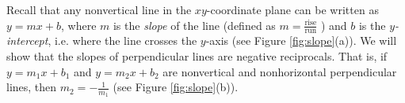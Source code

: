 \begin{center}\statecomment[0.6\textwidth]{\begin{equation}\label{eqn:sinplus90}
 \sin\;(\theta + 90\Degrees) ~ = ~ \cos\;\theta\phantom{-}
\end{equation}
\begin{equation}\label{eqn:cosplus90}
 \cos\;(\theta + 90\Degrees) ~ = ~ -\sin\;\theta
\end{equation}
\begin{equation}\label{eqn:tanplus90}
 \tan\;(\theta + 90\Degrees) ~ = ~ -\cot\;\theta
\end{equation}}\end{center}
\newpage
\begin{exmp}\label{exmp:slope}
 Recall that any nonvertical line in the $xy$-coordinate plane can be written as $y=mx+b$,
 where $m$ is the \emph{slope} of the line (defined as
 $m = \frac{\text{rise}}{\text{run}}$ ) and $b$ is the \emph{$y$-intercept},
 i.e. where the line crosses the $y$-axis (see Figure \ref{fig:slope}(a)).
 We will show that the slopes of perpendicular lines are negative reciprocals.
 That is, if $y=m_{1}x+b_1$ and $y=m_{2}x+b_2$ are nonvertical and nonhorizontal perpendicular
 lines, then $m_2 = -\frac{1}{m_1}$ (see Figure \ref{fig:slope}(b)).\vspace{-1mm}


\end{exmp}

